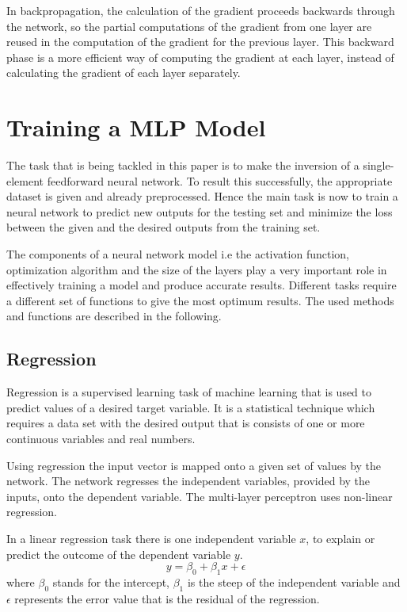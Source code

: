In backpropagation, the calculation of the gradient proceeds backwards through the network, so the partial computations of the gradient from one layer are reused in the computation of the gradient for the previous layer. This backward phase is a more efficient way of computing the gradient at each layer, instead of calculating the gradient of each layer separately.



\section{Training a MLP Model}

The task that is being tackled in this paper is to make the inversion of a single-element feedforward neural network. To result this successfully, the appropriate dataset is given and already preprocessed. Hence the main task is now to train a neural network to predict new outputs for the testing set and minimize the loss between the given and the desired outputs from the training set. \medskip

The components of a neural network model i.e the activation function, optimization algorithm and the size of the layers play a very important role in effectively training a model and produce accurate results. Different tasks require a different set of functions to give the most optimum results. The used methods and functions are described in the following.


\subsection{Regression}

Regression is a supervised learning task of machine learning that is used to predict values of a desired target variable. It is a statistical technique which requires a data set with the desired output that is consists of one or more continuous variables and real numbers.\smallskip

Using regression the input vector is mapped onto a given set of values by the network. The network regresses the independent variables, provided by the inputs, onto the dependent variable. The multi-layer perceptron uses non-linear regression.  \medskip

In a linear regression task there is one independent variable $x$, to explain or predict the outcome of the dependent variable $y$.
$$ y = \beta_0 + \beta_1x + \epsilon $$
where $\beta_0$ stands for the intercept, $\beta_1$ is the steep of the independent variable and $\epsilon$ represents the error value that is the residual of the regression. \medskip

